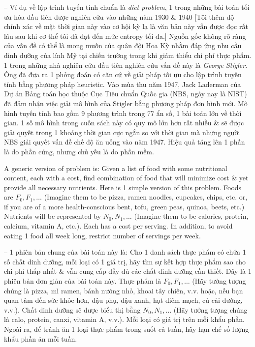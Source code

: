 \documentclass{article}
\begin{document}
\begin{itemize}
\begin{itemize}
        -- Ví dụ về lập trình tuyến tính chuẩn là {\it diet problem}, 1 trong những bài toán tối ưu hóa đầu tiên được nghiên cứu vào những năm 1930 \& 1940 [Tôi thêm độ chính xác về mặt thời gian này vào cơ hội kỳ lạ là văn bản này vẫn được đọc rất lâu sau khi cơ thể tôi đã đạt đến mức entropy tối đa.] Nguồn gốc không rõ ràng của vấn đề có thể là mong muốn của quân đội Hoa Kỳ nhằm đáp ứng nhu cầu dinh dưỡng của lính Mỹ tại chiến trường trong khi giảm thiểu chi phí thực phẩm. 1 trong những nhà nghiên cứu đầu tiên nghiên cứu vấn đề này là {\it George Stigler}. Ông đã đưa ra 1 phỏng đoán có căn cứ về giải pháp tối ưu cho lập trình tuyến tính bằng phương pháp heuristic. Vào mùa thu năm 1947, {\sc Jack Laderman} của Dự án Bảng toán học thuộc Cục Tiêu chuẩn Quốc gia (NBS, ngày nay là NIST) đã đảm nhận việc giải mô hình của Stigler bằng phương pháp đơn hình mới. Mô hình tuyến tính bao gồm 9 phương trình trong 77 ẩn số, 1 bài toán lớn về thời gian. 1 số mô hình trong cuốn sách này có quy mô lớn hơn rất nhiều \& sẽ được giải quyết trong 1 khoảng thời gian cực ngắn so với thời gian mà những người NBS giải quyết vấn đề chế độ ăn uống vào năm 1947. Hiệu quả tăng lên 1 phần là do phần cứng, nhưng chủ yếu là do phần mềm.

        A generic version of problem is: Given a list of food with some nutritional content, each with a cost, find combination of food that will minimize cost \& yet provide all necessary nutrients. Here is 1 simple version of this problem. Foods are $F_0,F_1,\ldots$ (Imagine them to be pizza, ramen noodles, cupcakes, chips, etc. or, if you are of a more health-conscious bent, tofu, green peas, quinoa, beets, etc.) Nutrients will be represented by $N_0,N_1,\ldots$ (Imagine them to be calories, protein, calcium, vitamin A, etc.). Each has a cost per serving. In addition, to avoid eating 1 food all week long, restrict number of servings per week.

        -- 1 phiên bản chung của bài toán này là: Cho 1 danh sách thực phẩm có chứa 1 số chất dinh dưỡng, mỗi loại có 1 giá trị, hãy tìm sự kết hợp thực phẩm sao cho chi phí thấp nhất \& vẫn cung cấp đầy đủ các chất dinh dưỡng cần thiết. Đây là 1 phiên bản đơn giản của bài toán này. Thực phẩm là $F_0,F_1,\ldots$ (Hãy tưởng tượng chúng là pizza, mì ramen, bánh nướng nhỏ, khoai tây chiên, v.v. hoặc, nếu bạn quan tâm đến sức khỏe hơn, đậu phụ, đậu xanh, hạt diêm mạch, củ cải đường, v.v.). Chất dinh dưỡng sẽ được biểu thị bằng $N_0,N_1,\ldots$ (Hãy tưởng tượng chúng là calo, protein, canxi, vitamin A, v.v.). Mỗi loại có giá trị trên mỗi khẩu phần. Ngoài ra, để tránh ăn 1 loại thực phẩm trong suốt cả tuần, hãy hạn chế số lượng khẩu phần ăn mỗi tuần.


\end{itemize}
\end{itemize}
\end{document}
